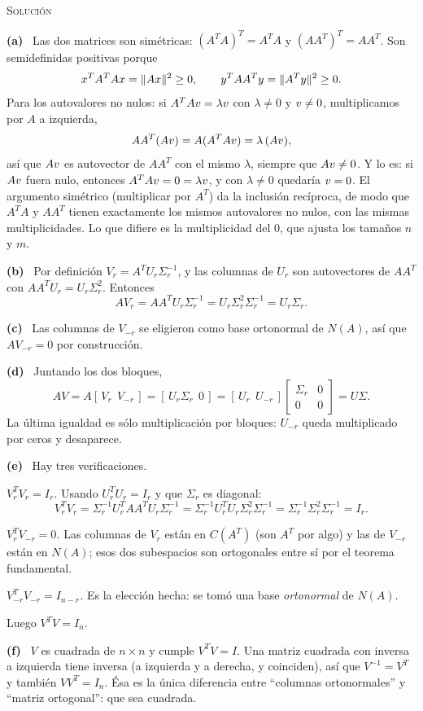 \documentclass[11pt,a4paper]{article}
\newcommand{\bi}[1]{\boldsymbol{#1}}
\newcommand{\n}[1]{\boldsymbol{#1}}
\DeclareMathOperator{\gen}{span}
\DeclareMathOperator{\tr}{tr}
\DeclareMathOperator{\rg}{rg}
\def\n#1{#1}\def\bi#1{#1}\def\rg{rg}\def\tr{tr}\def\gen{span}%
\newcommand{\solucion}{\par\medskip\noindent\textsc{Solución}\par\nobreak\smallskip\noindent}
\newcommand{\itemsol}[1]{\par\medskip\noindent\textbf{(#1)}\ \ignorespaces}
\begin{document}
\solucion
\itemsol{a} Las dos matrices son simétricas: $(A^TA)^T=A^TA$ y
$(AA^T)^T=AA^T$. Son semidefinidas positivas porque
\[
\bx^TA^TA\bx=\|A\bx\|^{2}\ge0,\qquad \by^TAA^T\by=\|A^T\by\|^{2}\ge0 .
\]
Para los autovalores no nulos: si $A^TA\bv=\lambda\bv$ con $\lambda\neq0$ y
$\bv\neq\n0$, multiplicamos por $A$ a izquierda,
\[
AA^T(A\bv)=A(A^TA\bv)=\lambda\,(A\bv),
\]
así que $A\bv$ es autovector de $AA^T$ con el mismo $\lambda$, siempre que
$A\bv\neq\n0$. Y lo es: si $A\bv$ fuera nulo, entonces $A^TA\bv=\n0=\lambda\bv$,
y con $\lambda\neq0$ quedaría $\bv=\n0$. El argumento simétrico (multiplicar por
$A^T$) da la inclusión recíproca, de modo que $A^TA$ y $AA^T$ tienen exactamente
los mismos autovalores no nulos, con las mismas multiplicidades. Lo que difiere
es la multiplicidad del $0$, que ajusta los tamaños $n$ y $m$.

\itemsol{b} Por definición $V_r=A^TU_r\Sigma_r^{-1}$, y las columnas de $U_r$ son
autovectores de $AA^T$ con $AA^TU_r=U_r\Sigma_r^2$. Entonces
\[
AV_r=AA^TU_r\Sigma_r^{-1}=U_r\Sigma_r^{2}\Sigma_r^{-1}=U_r\Sigma_r .
\]

\itemsol{c} Las columnas de $V_{-r}$ se eligieron como base ortonormal de $N(A)$,
así que $AV_{-r}=0$ por construcción.

\itemsol{d} Juntando los dos bloques,
\[
AV=A[\,V_r\ \ V_{-r}\,]=[\,U_r\Sigma_r\ \ 0\,]
=[\,U_r\ \ U_{-r}\,]\begin{bmatrix}\Sigma_r&0\\ 0&0\end{bmatrix}=U\Sigma .
\]
La última igualdad es sólo multiplicación por bloques: $U_{-r}$ queda
multiplicado por ceros y desaparece.

\itemsol{e} Hay tres verificaciones.

\emph{$V_r^TV_r=I_r$.} Usando $U_r^TU_r=I_r$ y que $\Sigma_r$ es diagonal:
\[
V_r^TV_r=\Sigma_r^{-1}U_r^TAA^TU_r\Sigma_r^{-1}
=\Sigma_r^{-1}U_r^TU_r\Sigma_r^{2}\Sigma_r^{-1}
=\Sigma_r^{-1}\Sigma_r^{2}\Sigma_r^{-1}=I_r .
\]

\emph{$V_r^TV_{-r}=0$.} Las columnas de $V_r$ están en $C(A^T)$ (son $A^T$ por
algo) y las de $V_{-r}$ están en $N(A)$; esos dos subespacios son ortogonales
entre sí por el teorema fundamental.

\emph{$V_{-r}^TV_{-r}=I_{n-r}$.} Es la elección hecha: se tomó una base
\emph{ortonormal} de $N(A)$.

Luego $V^TV=I_n$.

\itemsol{f} $V$ es cuadrada de $n\times n$ y cumple $V^TV=I$. Una matriz cuadrada
con inversa a izquierda tiene inversa (a izquierda y a derecha, y coinciden), así
que $V^{-1}=V^T$ y también $VV^T=I_n$. Ésa es la única diferencia entre
``columnas ortonormales'' y ``matriz ortogonal'': que sea cuadrada.
\end{document}

